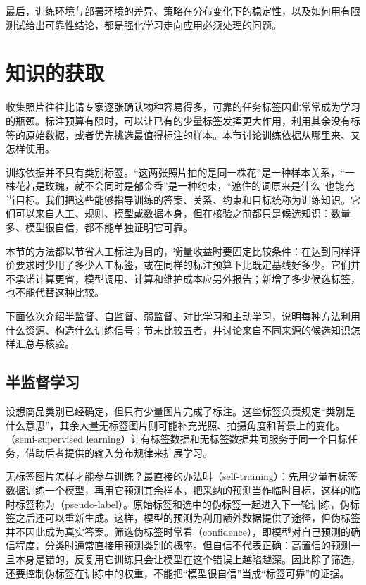 最后，训练环境与部署环境的差异、策略在分布变化下的稳定性，以及如何用有限测试给出可靠性结论，都是强化学习走向应用必须处理的问题。

\section{知识的获取}
\label{sec:efficient-knowledge-use-overview}

收集照片往往比请专家逐张确认物种容易得多，可靠的任务标签因此常常成为学习的瓶颈。标注预算有限时，可以让已有的少量标签发挥更大作用，利用其余没有标签的原始数据，或者优先挑选最值得标注的样本。本节讨论训练依据从哪里来、又怎样使用。

训练依据并不只有类别标签。“这两张照片拍的是同一株花”是一种样本关系，“一株花若是玫瑰，就不会同时是郁金香”是一种约束，“遮住的词原来是什么”也能充当目标。我们把这些能够指导训练的答案、关系、约束和目标统称为训练知识。它们可以来自人工、规则、模型或数据本身，但在核验之前都只是候选知识：数量多、模型很自信，都不能单独证明它可靠。

本节的方法都以节省人工标注为目的，衡量收益时要固定比较条件：在达到同样评价要求时少用了多少人工标签，或在同样的标注预算下比既定基线好多少。它们并不承诺计算更省，模型调用、计算和维护成本应另外报告；新增了多少候选标签，也不能代替这种比较。

下面依次介绍半监督、自监督、弱监督、对比学习和主动学习，说明每种方法利用什么资源、构造什么训练信号；节末比较五者，并讨论来自不同来源的候选知识怎样汇总与核验。

\subsection{半监督学习}
\label{sec:semi-supervised-learning}

设想商品类别已经确定，但只有少量图片完成了标注。这些标签负责规定“类别是什么意思”，其余大量无标签图片则可能补充光照、拍摄角度和背景上的变化。（semi-supervised learning）让有标签数据和无标签数据共同服务于同一个目标任务，借助后者提供的输入分布规律来扩展学习。

无标签图片怎样才能参与训练？最直接的办法叫（self-training）：先用少量有标签数据训练一个模型，再用它预测其余样本，把采纳的预测当作临时目标，这样的临时标签称为（pseudo-label）。原始标签和选中的伪标签一起进入下一轮训练，伪标签之后还可以重新生成。这样，模型的预测为利用额外数据提供了途径，但伪标签并不因此成为真实答案。筛选伪标签时常看（confidence），即模型对自己预测的确信程度，分类时通常直接用预测类别的概率。但自信不代表正确：高置信的预测一旦本身是错的，反复用它训练只会让模型在这个错误上越陷越深。因此除了筛选，还要控制伪标签在训练中的权重，不能把“模型很自信”当成“标签可靠”的证据。

